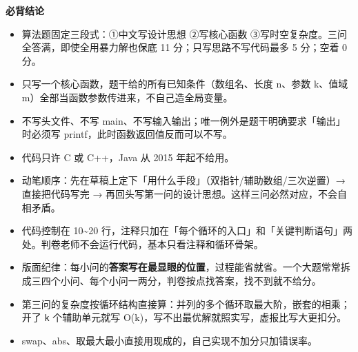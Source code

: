 \documentclass[10pt,a4paper]{ctexart}
\begin{document}


\textbf{必背结论}

\begin{itemize}

\item 算法题固定三段式：①中文写设计思想 ②写核心函数 ③写时空复杂度。三问全答满，即使全用暴力解也保底 11 分；只写思路不写代码最多 5 分；空着 0 分。

\item 只写一个核心函数，题干给的所有已知条件（数组名、长度 n、参数 k、值域 m）全部当函数参数传进来，不自己造全局变量。

\item 不写头文件、不写 main、不写输入输出；唯一例外是题干明确要求「输出」时必须写 printf，此时函数返回值反而可以不写。

\item 代码只许 C 或 C++，Java 从 2015 年起不给用。

\item 动笔顺序：先在草稿上定下「用什么手段」（双指针/辅助数组/三次逆置）→ 直接把代码写完 → 再回头写第一问的设计思想。这样三问必然对应，不会自相矛盾。

\item 代码控制在 10\textasciitilde{}20 行，注释只加在「每个循环的入口」和「关键判断语句」两处。判卷老师不会运行代码，基本只看注释和循环骨架。

\item 版面纪律：每小问的\textbf{答案写在最显眼的位置}，过程能省就省。一个大题常常拆成三四个小问、每个小问一两分，判卷按点找答案，找不到就不给分。

\item 第三问的复杂度按循环结构直接算：并列的多个循环取最大阶，嵌套的相乘；开了 \texttt{k} 个辅助单元就写 O(k)，写不出最优解就照实写，虚报比写大更扣分。

\item swap、abs、取最大最小直接用现成的，自己实现不加分只加错误率。

\end{itemize}

\end{document}
